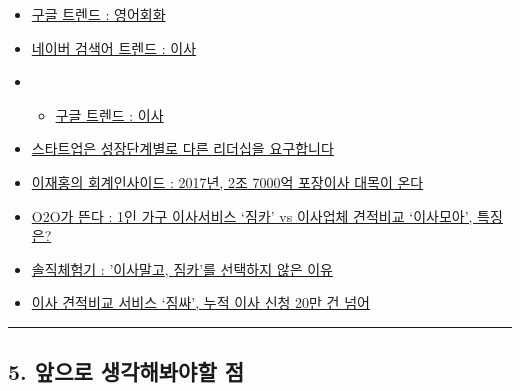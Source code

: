 \documentclass[11pt]{article}
\providecommand{\tightlist}{%
      \setlength{\itemsep}{0pt}\setlength{\parskip}{0pt}}
\begin{document}
\begin{itemize}
\item
  \href{https://trends.google.co.kr/trends/explore?geo=KR\&q=\%EC\%9D\%B4\%EC\%82\%AC,\%EC\%9C\%84\%EB\%A7\%A4\%EC\%B9\%98\%EB\%8B\%A4\%EC\%9D\%B4\%EC\%82\%AC,\%EB\%A7\%98\%EC\%B9\%B4\%ED\%8E\%98,\%EB\%A7\%98,\%EC\%9C\%84\%EB\%A7\%A4\%EC\%B9\%98}{구글
  트렌드 : 영어회화}
\item
  \href{https://datalab.naver.com/keyword/trendResult.naver?hashKey=N_50863677abeb20b470749175fc1841c1}{네이버
  검색어 트렌드 : 이사}
\item
  \begin{itemize}
  \tightlist
  \item
    \href{https://trends.google.co.kr/trends/explore?geo=KR\&q=\%EC\%9D\%B4\%EC\%82\%AC,\%EC\%9C\%84\%EB\%A7\%A4\%EC\%B9\%98\%EB\%8B\%A4\%EC\%9D\%B4\%EC\%82\%AC,\%ED\%8F\%AC\%EC\%9E\%A5\%EC\%9D\%B4\%EC\%82\%AC,\%EB\%8B\%A4\%EC\%9D\%B4\%EC\%82\%AC,\%EC\%9D\%B8\%ED\%85\%8C\%EB\%A6\%AC\%EC\%96\%B4}{구글
    트렌드 : 이사}
  \end{itemize}
\item
  \href{https://outstanding.kr/startupleadership20181107/?fbclid=IwAR2sVa1gzyPeWQGK0M_J2a9i_WzpnHttNO3Ar51_qUPwqR4KE29FFB8xMmI\#comment-72583}{스타트업은
  성장단계별로 다른 리더십을 요구합니다}
\item
  \href{http://clomag.co.kr/article/1817}{이재홍의 회계인사이드 :
  2017년, 2조 7000억 포장이사 대목이 온다}
\item
  \href{http://www.dailypop.kr/news/articleView.html?idxno=19619}{O2O가
  뜬다 : 1인 가구 이사서비스 `짐카' vs 이사업체 견적비교 `이사모아',
  특징은?}
\item
  \href{http://www.dailypop.kr/news/articleView.html?idxno=21703}{솔직체험기
  : '이사말고, 짐카'를 선택하지 않은 이유}
\item
  \href{https://platum.kr/archives/116187}{이사 견적비교 서비스 `짐싸',
  누적 이사 신청 20만 건 넘어}
\end{itemize}

\begin{center}\rule{0.5\linewidth}{\linethickness}\end{center}

\hypertarget{uxc55euxc73cuxb85c-uxc0dduxac01uxd574uxbd10uxc57cuxd560-uxc810}{%
\subsection{5. 앞으로 생각해봐야할
점}\label{uxc55euxc73cuxb85c-uxc0dduxac01uxd574uxbd10uxc57cuxd560-uxc810}}
\end{document}

